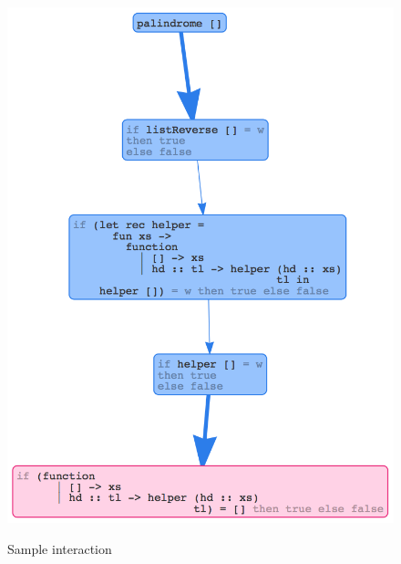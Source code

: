 \begin{figure}[t]
\includegraphics[width=\linewidth]{palindrome3} \\
\caption{Sample interaction}
\label{fig:nanomaly-palindrome}
\end{figure}
